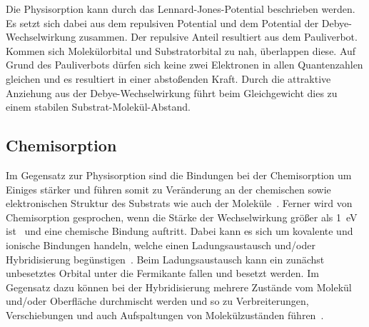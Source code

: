             Die Physisorption kann durch das Lennard-Jones-Potential beschrieben werden.
            Es setzt sich dabei aus dem repulsiven Potential und dem Potential der Debye-Wechselwirkung zusammen.
            Der repulsive Anteil resultiert aus dem Pauliverbot. 
            Kommen sich Molekülorbital und Substratorbital zu nah, überlappen diese.
            Auf Grund des Pauliverbots dürfen sich keine zwei Elektronen in allen Quantenzahlen gleichen und es resultiert in einer abstoßenden Kraft.
            Durch die attraktive Anziehung aus der Debye-Wechselwirkung führt beim Gleichgewicht dies zu einem stabilen Substrat-Molekül-Abstand.
        
        \subsection{Chemisorption}
            Im Gegensatz zur Physisorption sind die Bindungen bei der Chemisorption um Einiges stärker und führen somit zu Veränderung an der chemischen sowie elektronischen Struktur des Substrats wie auch der Moleküle~\cite{bergenti_spinterface_2019}.
            Ferner wird von Chemisorption gesprochen, wenn die Stärke der Wechselwirkung größer als \SI{1}{\electronvolt} ist~\cite{muscat_chemisorption_1978} und eine chemische Bindung auftritt.
            Dabei kann es sich um kovalente und ionische Bindungen handeln, welche einen Ladungsaustausch und/oder Hybridisierung begünstigen~\cite{harutyunyan_hybridisation_2013}.
            Beim Ladungsaustausch kann ein zunächst unbesetztes Orbital unter die Fermikante fallen und besetzt werden.
            Im Gegensatz dazu können bei der Hybridisierung mehrere Zustände vom Molekül und/oder Oberfläche durchmischt werden und so zu Verbreiterungen, Verschiebungen und auch Aufspaltungen von Molekülzuständen führen~\cite{IF_1}.

